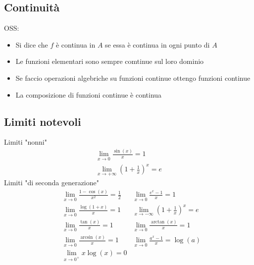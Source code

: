 \subsection{Continuità}
OSS:
\begin{itemize}
	\item Si dice che $f$ è continua in $A$ se essa è continua in ogni punto di $A$
	\item Le funzioni elementari sono sempre comtinue sul loro dominio
	\item Se faccio operazioni algebriche su funzioni continue ottengo funzioni continue
	\item La composizione di funzioni continue è continua
\end{itemize}
\subsection{Limiti notevoli}
Limiti "nonni"
\begin{gather}
	\lim_{x \to 0} \frac{\sin\left( x \right) }{x} = 1 \\
	\lim_{x \to + \infty} \left( 1+\frac{1}{x} \right) ^{x} = e
\end{gather}
Limiti "di seconda generazione"
\begin{align*}
	& \lim_{x \to 0} \frac{1-\cos\left( x \right) }{x^2} = \frac{1}{2} &\lim_{x \to 0} \frac{e^{x}-1}{x}=1 \\
	& \lim_{x \to 0} \frac{\log\left( 1+x \right) }{x}=1 &\lim_{x \to -\infty} \left( 1+\frac{1}{x} \right) ^{x} = e\\
	& \lim_{x \to 0} \frac{ \tan \left( x \right) }{x}=1  & \lim_{x \to 0} \frac{\arctan \left( x \right) }{x} = 1  \\
	& \lim_{x \to 0} \frac{\arcsin \left( x \right) }{x} = 1 & \lim_{x \to 0} \frac{a^{x}-1}{x}= \log \left( a \right) \\
	& \lim_{x \to 0^{+}} x \log \left( x \right) =0
\end{align*}
